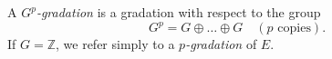 A \textit{$G^p$-gradation} is a gradation with respect to the group
$$G^p = G \oplus \dots \oplus G \quad (p \text{ copies}).$$
If $G = \mathbb{Z}$, we refer simply to a \textit{$p$-gradation} of $E$.
